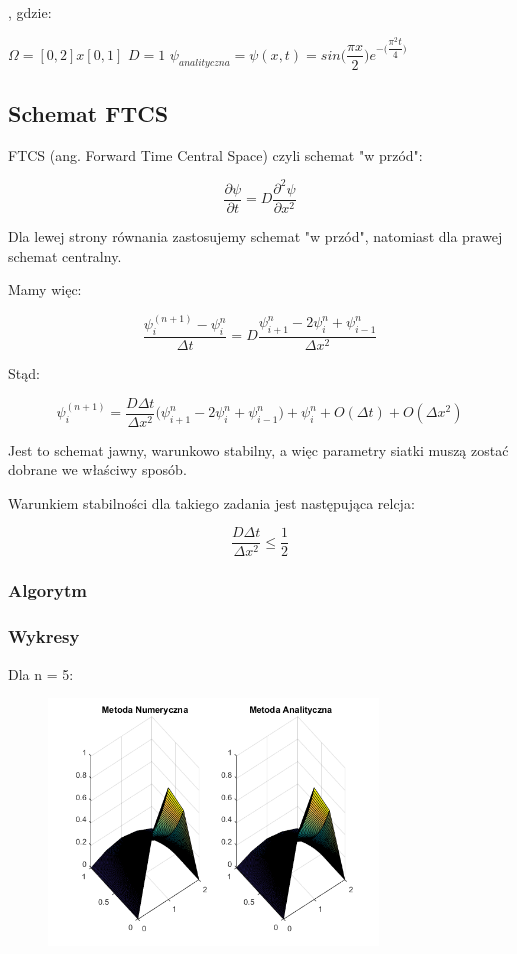 , gdzie:

$\Omega = [0,2]x[0,1]$
\newline
$D=1$
\newline
\vspace{0.2cm}
$\psi_{analityczna}=\psi(x,t)=sin\Big(\dfrac{\pi x}{2}\Big)e^{-\Big(\dfrac{\pi^2 t}{4}\Big)}$

\subsection{Schemat FTCS}

FTCS (ang. Forward Time Central Space) czyli schemat "w przód":

$$\dfrac{\partial \psi}{\partial t} = D\dfrac{\partial^2 \psi}{\partial x^2}$$

Dla lewej strony równania zastosujemy schemat "w przód", natomiast dla prawej schemat centralny.

Mamy więc:

$$\dfrac{\psi^{(n+1)}_{i}-\psi^n_{i}}{\Delta t}=D\dfrac{\psi^{n}_{i+1}-2\psi^n_{i}+\psi^n_{i-1}}{\Delta x^2}$$

Stąd:

$$\psi^{(n+1)}_{i}=\dfrac{D\Delta t}{\Delta x^2}\Big(\psi^{n}_{i+1}-2\psi^{n}_{i}+\psi^{n}_{i-1}\Big)+\psi^{n}_{i} + O(\Delta t)+O(\Delta x^2)$$

Jest to schemat jawny, warunkowo stabilny, a więc parametry siatki muszą zostać dobrane we właściwy sposób.

Warunkiem stabilności dla takiego zadania jest następująca relcja:

$$\dfrac{D\Delta t}{\Delta x^2}\le \dfrac{1}{2}$$

\subsubsection{Algorytm}


\newpage
\subsubsection{Wykresy}

Dla n = 5:

\begin{figure}[!ht]
	\begin{center}
		\includegraphics[width=0.78\textwidth]{Lab7/charts/ftcs/5.png}
	\end{center}
\end{figure}

